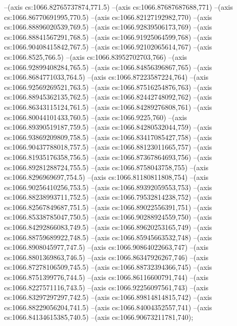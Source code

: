 --(axis cs:1066.82765737874,771.5)
--(axis cs:1066.87687687688,771)
--(axis cs:1066.86770691995,770.5)
--(axis cs:1066.82127192982,770)
--(axis cs:1066.88896020539,769.5)
--(axis cs:1066.92839506173,769)
--(axis cs:1066.88841567291,768.5)
--(axis cs:1066.91925064599,768)
--(axis cs:1066.90408415842,767.5)
--(axis cs:1066.92102065614,767)
--(axis cs:1066.8525,766.5)
--(axis cs:1066.83952702703,766)
--(axis cs:1066.92899408284,765.5)
--(axis cs:1066.84856396867,765)
--(axis cs:1066.8684771033,764.5)
--(axis cs:1066.87223587224,764)
--(axis cs:1066.92569269521,763.5)
--(axis cs:1066.87516254876,763)
--(axis cs:1066.88945362135,762.5)
--(axis cs:1066.82442748092,762)
--(axis cs:1066.86343115124,761.5)
--(axis cs:1066.84289276808,761)
--(axis cs:1066.80044101433,760.5)
--(axis cs:1066.9225,760)
--(axis cs:1066.89390519187,759.5)
--(axis cs:1066.84280532044,759)
--(axis cs:1066.93869209809,758.5)
--(axis cs:1066.83417085427,758)
--(axis cs:1066.90437788018,757.5)
--(axis cs:1066.88123011665,757)
--(axis cs:1066.81935176358,756.5)
--(axis cs:1066.87367864693,756)
--(axis cs:1066.89281288724,755.5)
--(axis cs:1066.8758043758,755)
--(axis cs:1066.8296969697,754.5)
--(axis cs:1066.81180811808,754)
--(axis cs:1066.90256410256,753.5)
--(axis cs:1066.89392059553,753)
--(axis cs:1066.88238993711,752.5)
--(axis cs:1066.79532814238,752)
--(axis cs:1066.82567849687,751.5)
--(axis cs:1066.89022556391,751)
--(axis cs:1066.85338785047,750.5)
--(axis cs:1066.90288924559,750)
--(axis cs:1066.84292866083,749.5)
--(axis cs:1066.89620253165,749)
--(axis cs:1066.88759689922,748.5)
--(axis cs:1066.85945663532,748)
--(axis cs:1066.8908045977,747.5)
--(axis cs:1066.90864022663,747)
--(axis cs:1066.8801369863,746.5)
--(axis cs:1066.86347926267,746)
--(axis cs:1066.87278106509,745.5)
--(axis cs:1066.88732394366,745)
--(axis cs:1066.8751399776,744.5)
--(axis cs:1066.86116600791,744)
--(axis cs:1066.8227571116,743.5)
--(axis cs:1066.92256097561,743)
--(axis cs:1066.83297297297,742.5)
--(axis cs:1066.89814814815,742)
--(axis cs:1066.88229056204,741.5)
--(axis cs:1066.84004352557,741)
--(axis cs:1066.84134615385,740.5)
--(axis cs:1066.90673211781,740);


